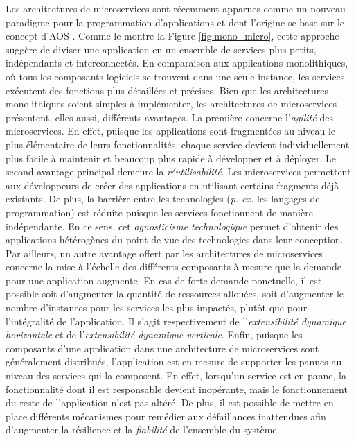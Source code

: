Les architectures de microservices sont récemment apparues comme un nouveau paradigme pour la programmation d'applications \citep{Dragoni2017} et dont l'origine se base sur le concept d'\ac{AOS} \citep{MacKenzie2006}. Comme le montre la Figure \ref{fig:mono_micro}, cette approche suggère de diviser une application en un ensemble de services plus petits, indépendants et interconnectés. En comparaison aux applications monolithiques, où tous les composants logiciels se trouvent dans une seule instance, les services exécutent des fonctions plus détaillées et précises. Bien que les architectures monolithiques soient simples à implémenter, les architectures de microservices présentent, elles aussi, différents avantages. La première concerne l'\emph{agilité} des microservices. En effet, puisque les applications sont fragmentées au niveau le plus élémentaire de leurs fonctionnalités, chaque service devient individuellement plus facile à maintenir et beaucoup plus rapide à développer et à déployer. Le second avantage principal demeure la \emph{réutilisabilité}. Les microservices permettent aux développeurs de créer des applications en utilisant certains fragments déjà existants. De plus, la barrière entre les technologies (\textit{p. ex.} les langages de programmation) est réduite puisque les services fonctionnent de manière indépendante. En ce sens, cet \emph{agnosticisme technologique} permet d'obtenir des applications hétérogènes du point de vue des technologies dans leur conception. Par ailleurs, un autre avantage offert par les architectures de microservices concerne la mise à l'échelle des différents composants à mesure que la demande pour une application augmente. En cas de forte demande ponctuelle, il est possible soit d'augmenter la quantité de ressources allouées, soit d'augmenter le nombre d'instances pour les services les plus impactés, plutôt que pour l'intégralité de l'application. Il s'agit respectivement de l'\emph{extensibilité dynamique horizontale} et de l'\emph{extensibilité dynamique verticale}. Enfin, puisque les composants d'une application dans une architecture de microservices sont généralement distribués, l'application est en mesure de supporter les pannes au niveau des services qui la composent. En effet, lorsqu'un service est en panne, la fonctionnalité dont il est responsable devient inopérante, mais le fonctionnement du reste de l'application n'est pas altéré. De plus, il est possible de mettre en place différents mécanismes pour remédier aux défaillances inattendues afin d'augmenter la résilience et la \emph{fiabilité} de l'ensemble du système.

